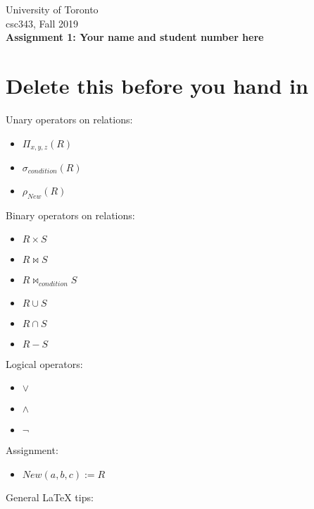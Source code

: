 \documentclass{article}
\begin{document}
\noindent
University of Toronto\\
{\sc csc}343, Fall 2019\\[10pt]
{\LARGE\bf Assignment 1: Your name and student number here}

\section*{Delete this before you hand in}

\noindent
Unary operators on relations:
\begin{itemize}
\item $\Pi_{x, y, z} (R)$
\item $\sigma_{condition} (R) $
\item $\rho_{New} (R) $
\end{itemize}
Binary operators on relations:
\begin{itemize}
\item $R \times S$
\item $R \bowtie S$
\item $R \bowtie_{condition} S$
\item $R \cup S$
\item $R \cap S$
\item $R - S$
\end{itemize}
Logical operators:
\begin{itemize}
\item $\vee$
\item $\wedge$
\item $\neg$
\end{itemize}
Assignment:
\begin{itemize}
\item $New(a, b, c) := R$
\end{itemize}
General LaTeX tips:
\end{document}
